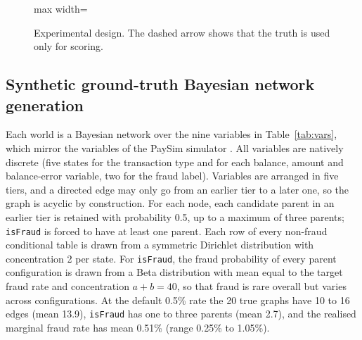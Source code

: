 \documentclass[final,5p,times,authoryear]{elsarticle}
\begin{document}
\begin{figure}[H]
\centering
\begin{adjustbox}{max width=\linewidth}\end{adjustbox}
\caption{Experimental design. The dashed arrow shows that the truth is used only for scoring.}\label{fig:design}
\end{figure}

\subsection{Synthetic ground-truth Bayesian network generation}
Each world is a Bayesian network over the nine variables in Table~\ref{tab:vars}, which mirror the variables of the PaySim simulator \citep{lopez2016}. All variables are natively discrete (five states for the transaction type and for each balance, amount and balance-error variable, two for the fraud label). Variables are arranged in five tiers, and a directed edge may only go from an earlier tier to a later one, so the graph is acyclic by construction. For each node, each candidate parent in an earlier tier is retained with probability 0.5, up to a maximum of three parents; \texttt{isFraud} is forced to have at least one parent. Each row of every non-fraud conditional table is drawn from a symmetric Dirichlet distribution with concentration 2 per state. For \texttt{isFraud}, the fraud probability of every parent configuration is drawn from a Beta distribution with mean equal to the target fraud rate and concentration $a+b=40$, so that fraud is rare overall but varies across configurations. At the default 0.5\% rate the 20 true graphs have 10 to 16 edges (mean 13.9), \texttt{isFraud} has one to three parents (mean 2.7), and the realised marginal fraud rate has mean 0.51\% (range 0.25\% to 1.05\%).
\end{document}
